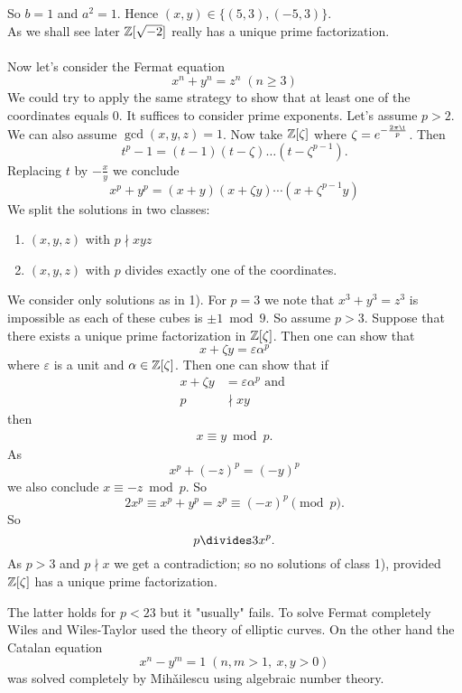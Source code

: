 \documentclass[NumTh.tex]{subfiles}
\begin{document}
So $b = 1$ and $a^2 = 1$.
Hence $(x,y) \in \{(5,3), (-5,3)\}$.
\\
As we shall see later $\mathbb{Z}[\sqrt{-2}]$ really has a unique prime factorization.\\
\\
Now let's consider the Fermat equation
\[ x^n + y^n = z^n \; (n\geq 3) \]
We could try to apply the same strategy to show that at least one of the coordinates equals $0$.
It suffices to consider prime exponents. Let's assume $p > 2$.
We can also assume $\gcd(x,y,z) = 1$.
Now take $\mathbb{Z}[\zeta]$ where $\zeta = e^{-\frac{2\pi \i}{p}}$.
Then
\[ t^p - 1 = (t-1)(t-\zeta)\dots (t-\zeta^{p-1}) \text{.} \]
Replacing $t$ by $- \frac{x}{y}$ we conclude
\[ x^p + y^p = (x+y)(x + \zeta y) \cdots (x + \zeta^{p-1}y) \]
We split the solutions in two classes:
\begin{enumerate}
  \item $(x,y,z)$ with $p \nmid xyz$
  \item $(x,y,z)$ with $p$ divides exactly one of the coordinates.
\end{enumerate}
We consider only solutions as in 1).
For $p = 3$ we note that $x^3 + y^3 = z^3$ is impossible as each of these cubes is $\pm 1 \bmod 9$.
So assume $p>3$.
Suppose that there exists a unique prime factorization in $\mathbb{Z}[\zeta]$. 
Then one can show that 
\[ x + \zeta y = \varepsilon \alpha^p \] 
where $\varepsilon$ is a unit and $\alpha \in \mathbb{Z}[\zeta]$.
Then one can show that if
\begin{align*}
  x+ \zeta y &= \varepsilon \alpha^p \text{ and } \\ 
  p &\nmid xy
\end{align*}
then
\begin{align*}
  x \equiv y \bmod p \text{.}
\end{align*}
As 
\[ x^p + (-z)^p = (-y)^p\]
we also conclude $x  \equiv -z \bmod p$.
So 
\[ 2x^p \equiv x^p + y^p = z^p \equiv (-x)^p \pmod p \text{.} \]
So 
\[ p \divides 3 x^p \text{.} \]
As $p > 3$ and $p \nmid x$ we get a contradiction; so no solutions of class 1), provided $\mathbb{Z}[\zeta]$ has a unique prime factorization.

The latter holds for $p < 23$ but it "usually" fails.
To solve Fermat completely Wiles and Wiles-Taylor used the theory of elliptic curves.
On the other hand the Catalan equation
\[ x^n - y^m = 1 \; (n,m > 1,\:x,y >0) \]
was solved completely by Mih\v{a}ilescu using algebraic number theory.
\end{document}
